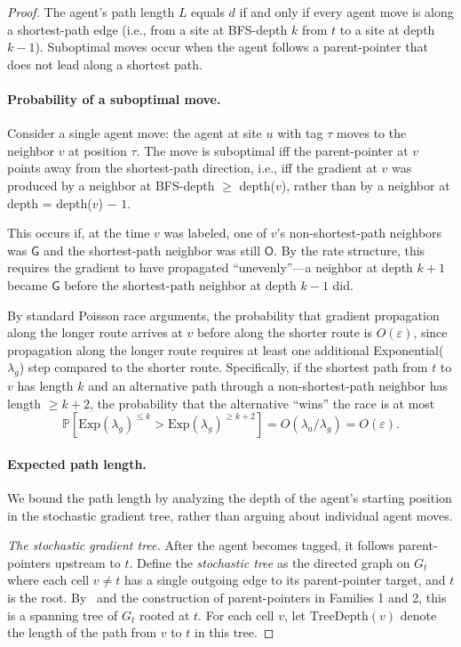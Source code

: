\documentclass[11pt]{article}
\theoremstyle{plain}
\theoremstyle{definition}
\theoremstyle{remark}
\newcommand{\Pr}{\mathbb{P}}
\begin{document}
\begin{proof}
The agent's path length $L$ equals $d$ if and only if every agent move is along a shortest-path edge (i.e., from a site at BFS-depth $k$ from $t$ to a site at depth $k - 1$). Suboptimal moves occur when the agent follows a parent-pointer that does not lead along a shortest path.

\paragraph{Probability of a suboptimal move.} Consider a single agent move: the agent at site $u$ with tag $\tau$ moves to the neighbor $v$ at position $\tau$. The move is suboptimal iff the parent-pointer at $v$ points away from the shortest-path direction, i.e., iff the gradient at $v$ was produced by a neighbor at BFS-depth $\geq$ depth($v$), rather than by a neighbor at depth = depth($v$) $-$ $1$.

This occurs if, at the time $v$ was labeled, one of $v$'s non-shortest-path neighbors was $\mathsf{G}$ and the shortest-path neighbor was still $\mathsf{O}$. By the rate structure, this requires the gradient to have propagated ``unevenly''---a neighbor at depth $k+1$ became $\mathsf{G}$ before the shortest-path neighbor at depth $k-1$ did.

By standard Poisson race arguments, the probability that gradient propagation along the longer route arrives at $v$ before along the shorter route is $O(\varepsilon)$, since propagation along the longer route requires at least one additional Exponential($\lambda_g$) step compared to the shorter route. Specifically, if the shortest path from $t$ to $v$ has length $k$ and an alternative path through a non-shortest-path neighbor has length $\geq k + 2$, the probability that the alternative ``wins'' the race is at most
\[
\Pr[\text{Exp}(\lambda_g)^{\leq k} > \text{Exp}(\lambda_g)^{\geq k+2}] = O(\lambda_a / \lambda_g) = O(\varepsilon).
\]

\paragraph{Expected path length.}
We bound the path length by analyzing the depth of the agent's starting position in the stochastic gradient tree, rather than arguing about individual agent moves.

\emph{The stochastic gradient tree.} After the agent becomes tagged, it follows parent-pointers upstream to $t$. Define the \emph{stochastic tree} as the directed graph on $G_t$ where each cell $v \neq t$ has a single outgoing edge to its parent-pointer target, and $t$ is the root. By~ and the construction of parent-pointers in Families 1 and 2, this is a spanning tree of $G_t$ rooted at $t$. For each cell $v$, let $\mathrm{TreeDepth}(v)$ denote the length of the path from $v$ to $t$ in this tree.


\end{proof}
\end{document}
